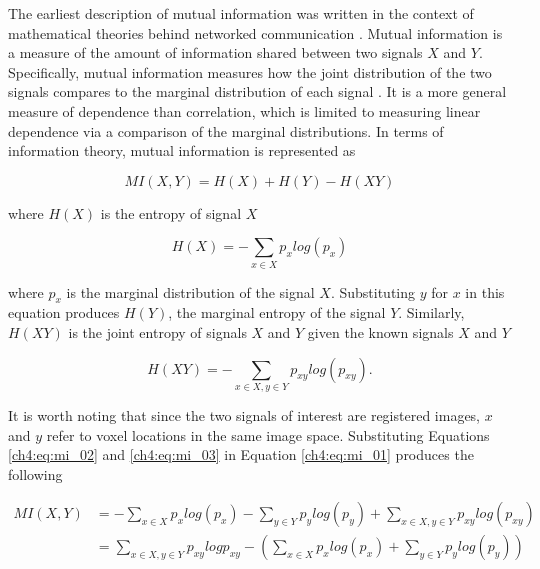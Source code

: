 The earliest description of mutual information was written in the context of mathematical theories behind networked communication \cite{Shannon1948}. Mutual information is a measure of the amount of information shared between two signals $X$ and $Y$. Specifically, mutual information measures how the joint distribution of the two signals compares to the marginal distribution of each signal \cite{Li1990}. It is a more general measure of dependence than correlation, which is limited to measuring linear dependence via a comparison of the marginal distributions. In terms of information theory, mutual information is represented as

\begin{equation}
\label{ch4:eq:mi_01}
MI(X, Y) = H(X) + H(Y) - H(XY)
\end{equation}

\noindent where $H(X)$ is the entropy of signal $X$

\begin{equation}
\label{ch4:eq:mi_02}
H(X) = - \sum_{x \in X} p_x log(p_x) 
\end{equation}

\noindent where $p_x$ is the marginal distribution of the signal $X$. Substituting $y$ for $x$ in this equation produces $H(Y)$, the marginal entropy of the signal $Y$. Similarly, $H(XY)$ is the joint entropy of signals $X$ and $Y$ given the known signals $X$ and $Y$

\begin{equation}
\label{ch4:eq:mi_03}
H(XY) = - \sum_{x \in X, y \in Y} p_{xy} log (p_{xy}).
\end{equation}

It is worth noting that since the two signals of interest are registered images, $x$ and $y$ refer to voxel locations in the same image space. Substituting Equations \ref{ch4:eq:mi_02} and \ref{ch4:eq:mi_03} in Equation \ref{ch4:eq:mi_01} produces the following

\begin{equation}
\label{ch4:eq:mi_04}
\begin{split}
MI(X, Y) & = - \sum_{x \in X} p_x log(p_x) - \sum_{y \in Y} p_y log(p_y) + \sum_{x \in X, y \in Y} p_{xy} log (p_{xy}) \\
 & = \sum_{x \in X, y \in Y} p_{xy} log p_{xy} - \left( \sum_{x \in X} p_x log(p_x) + \sum_{y \in Y} p_y log(p_y) \right) \\
\end{split}
\end{equation}

